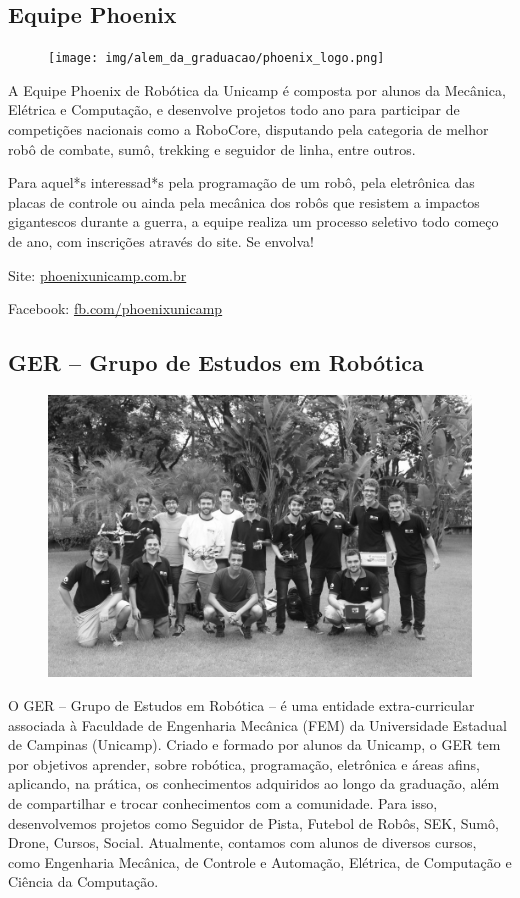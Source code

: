 \subsection{Equipe Phoenix}

\begin{figure}[h!]
    \centering
    \texttt{[image: img/alem\_da\_graduacao/phoenix\_logo.png]}
\end{figure}

A Equipe Phoenix de Robótica da Unicamp é composta por alunos da Mecânica,
Elétrica e Computação, e desenvolve projetos todo ano para participar de
competições nacionais como a RoboCore, disputando pela categoria de melhor robô
de combate, sumô, trekking e seguidor de linha, entre outros.

Para aquel*s interessad*s pela programação de um robô, pela eletrônica das
placas de controle ou ainda pela mecânica dos robôs que resistem a impactos
gigantescos durante a guerra, a equipe realiza um processo seletivo todo começo
de ano, com inscrições através do site. Se envolva!

\begin{compactitemize}
    \item  Site: \url{phoenixunicamp.com.br}
    \item  Facebook: \url{fb.com/phoenixunicamp}
\end{compactitemize}

\subsection{GER -- Grupo de Estudos em Robótica}

\begin{figure}[h!]
    \centering
    \includegraphics[width=.35\textwidth]{img/alem_da_graduacao/ger_equipe.jpeg}
\end{figure}

O GER – Grupo de Estudos em Robótica – é uma entidade extra-curricular
associada à Faculdade de Engenharia Mecânica (FEM) da Universidade Estadual
de Campinas (Unicamp). Criado e formado por alunos da Unicamp, o GER tem por
objetivos aprender, sobre robótica, programação, eletrônica e áreas afins,
aplicando, na prática, os conhecimentos adquiridos ao longo da graduação,
além de compartilhar e trocar conhecimentos com a comunidade. Para isso,
desenvolvemos projetos como Seguidor de Pista, Futebol de Robôs, SEK, Sumô,
Drone, Cursos, Social. Atualmente, contamos com alunos de diversos cursos, como
Engenharia Mecânica, de Controle e Automação, Elétrica, de Computação e
Ciência da Computação.


